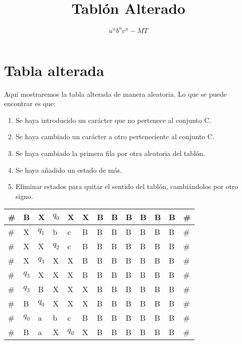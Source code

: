 ﻿\documentclass[a4paper,10pt]{article}
\title{Tablón Alterado}
\author{$a^nb^nc^n-MT$}
\date{}
\begin{document}
\maketitle

\section{Tabla alterada}

Aquí mostraremos la tabla alterada de manera aleatoria. Lo que se puede encontrar es que:
\begin{enumerate}
\item Se haya introducido un carácter que no pertenece al conjunto C.
\item Se haya cambiado un carácter a otro perteneciente al conjunto C.
\item Se haya cambiado la primera fila por otra aleatoria del tablón.
\item Se haya añadido un estado de más.
\item Eliminar estados para quitar el sentido del tablón, cambiándolos por otro signo.
\end{enumerate}\begin{table}[h]
\centering
\begin{tabular}{|l|l|l|l|l|l|l|l|l|l|l|l|l|}
\hline
	\#  &   B   &   X   &   $q_0$  &   X   &   X   &   B   &   B   &   B   &   B   &   B   &   B   &   \#	\\ \hline
	\#  &   X   &   $q_1$  &   b   &   c   &   B   &   B   &   B   &   B   &   B   &   B   &   B   &   \#	\\ \hline
	\#  &   X   &   X   &   $q_2$  &   c   &   B   &   B   &   B   &   B   &   B   &   B   &   B   &   \#	\\ \hline
	\#  &   X   &   $q_3$  &   X   &   X   &   B   &   B   &   B   &   B   &   B   &   B   &   B   &   \#	\\ \hline
	\#  &   $q_3$  &   X   &   X   &   X   &   B   &   B   &   B   &   B   &   B   &   B   &   B   &   \#	\\ \hline
	\#  &   $q_3$  &   B   &   X   &   X   &   X   &   B   &   B   &   B   &   B   &   B   &   B   &   \#	\\ \hline
	\#  &   B   &   $q_0$  &   X   &   X   &   X   &   B   &   B   &   B   &   B   &   B   &   B   &   \#	\\ \hline
	\#  &   $q_0$  &   a   &   b   &   c   &   B   &   B   &   B   &   B   &   B   &   B   &   B   &   \#	\\ \hline
	\#  &   B   &   a   &   X   &   $q_0$  &   X   &   B   &   B   &   B   &   B   &   B   &   B   &   \#	\\ \hline

\end{tabular}
\end{table}
\end{document}
